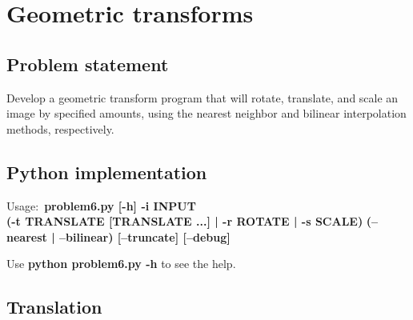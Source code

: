 \chapter{Geometric transforms}

\section{Problem statement}

Develop a geometric transform program that will rotate, translate,
and scale an image by specified amounts, using the nearest neighbor
and bilinear interpolation methods, respectively.

\section{Python implementation}

Usage:~\textbf{problem6.py [-h] -i INPUT} \\
       \textbf{(-t TRANSLATE [TRANSLATE ...] | -r ROTATE | -s SCALE)}
       \textbf{(--nearest | --bilinear) [--truncate] [--debug]}

Use \textbf{python problem6.py -h} to see the help.

\pagebreak


\pagebreak

\section{Translation}



